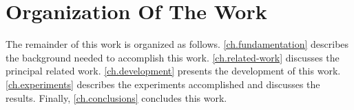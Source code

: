 \section{Organization Of The Work}
\label{sec.organization}
	
	The remainder of this work is organized as follows.
	\autoref{ch.fundamentation} describes the background needed to accomplish this work.
	\autoref{ch.related-work} discusses the principal related work.
	\autoref{ch.development} presents the development of this work.
	\autoref{ch.experiments} describes the experiments accomplished and discusses the results.
	Finally, \autoref{ch.conclusions} concludes this work.